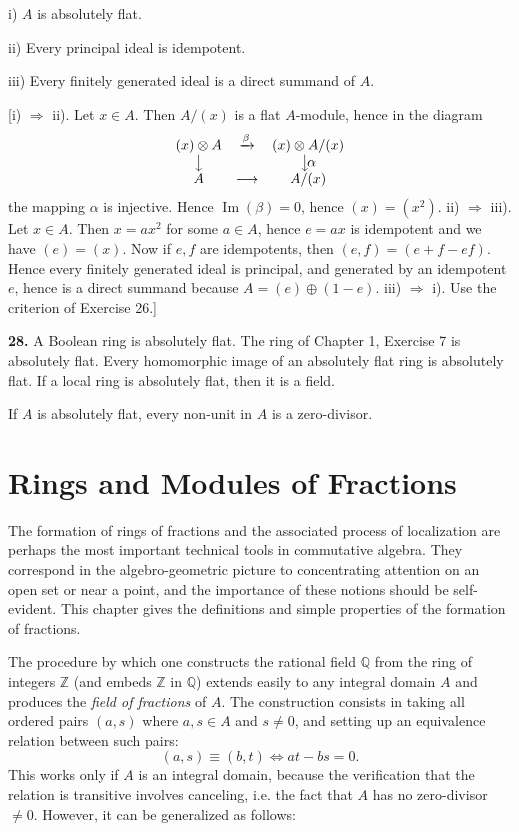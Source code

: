 i) $A$ is absolutely flat.

ii) Every principal ideal is idempotent.

iii) Every finitely generated ideal is a direct summand of $A$.

[i) $\Rightarrow$ ii).  Let $x\in A$.  Then $A/(x)$ is a flat $A$-module, hence in the diagram
\[
\begin{array}{ccc}
(x)\otimes A&\xrightarrow{\beta}&(x)\otimes A/(x)\\
\big\downarrow&&\big\downarrow\!\alpha\\
A&\longrightarrow&A/(x)
\end{array}
\]
the mapping $\alpha$ is injective.  Hence $\operatorname{Im}(\beta)=0$, hence $(x)=(x^2)$.  ii) $\Rightarrow$ iii).  Let
$x\in A$.  Then $x=ax^2$ for some $a\in A$, hence $e=ax$ is idempotent and we have
$(e)=(x)$.  Now if $e,f$ are idempotents, then $(e,f)=(e+f-ef)$.  Hence every
finitely generated ideal is principal, and generated by an idempotent $e$, hence is a
direct summand because $A=(e)\oplus(1-e)$.  iii) $\Rightarrow$ i).  Use the criterion of
Exercise 26.]

\medskip
\noindent\textbf{28.} A Boolean ring is absolutely flat.  The ring of Chapter 1, Exercise 7 is absolutely
flat.  Every homomorphic image of an absolutely flat ring is absolutely flat.  If a
local ring is absolutely flat, then it is a field.

If $A$ is absolutely flat, every non-unit in $A$ is a zero-divisor.

\section{Rings and Modules of Fractions}

The formation of rings of fractions and the associated process of localization
are perhaps the most important technical tools in commutative algebra.  They
correspond in the algebro-geometric picture to concentrating attention on an
open set or near a point, and the importance of these notions should be self-evident.  This chapter gives the definitions and simple properties of the formation
of fractions.

The procedure by which one constructs the rational field $\mathbb Q$ from the ring
of integers $\mathbb Z$ (and embeds $\mathbb Z$ in $\mathbb Q$) extends easily to any integral domain $A$ and
produces the \emph{field of fractions} of $A$.  The construction consists in taking all
ordered pairs $(a,s)$ where $a,s\in A$ and $s\ne0$, and setting up an equivalence
relation between such pairs:
\[
(a,s)\equiv(b,t)\Longleftrightarrow at-bs=0.
\]
This works only if $A$ is an integral domain, because the verification that the
relation is transitive involves canceling, i.e. the fact that $A$ has no zero-divisor
$\ne0$.  However, it can be generalized as follows:

